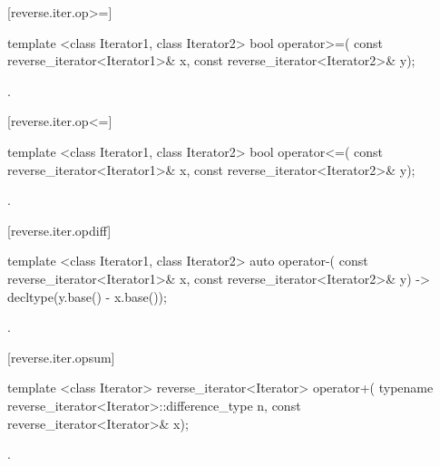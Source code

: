 [reverse.iter.op>=]{}

%
\begin{itemdecl}
template <class Iterator1, class Iterator2>
  bool operator>=(
    const reverse_iterator<Iterator1>& x,
    const reverse_iterator<Iterator2>& y);
\end{itemdecl}

\begin{itemdescr}
\pnum
\returns
{}.
\end{itemdescr}

[reverse.iter.op<=]{}

%
\begin{itemdecl}
template <class Iterator1, class Iterator2>
  bool operator<=(
    const reverse_iterator<Iterator1>& x,
    const reverse_iterator<Iterator2>& y);
\end{itemdecl}

\begin{itemdescr}
\pnum
\returns
{}.
\end{itemdescr}

[reverse.iter.opdiff]{}

%
\begin{itemdecl}
template <class Iterator1, class Iterator2>
    auto operator-(
    const reverse_iterator<Iterator1>& x,
    const reverse_iterator<Iterator2>& y) -> decltype(y.base() - x.base());
\end{itemdecl}

\begin{itemdescr}
\pnum
\returns
{}.
\end{itemdescr}

[reverse.iter.opsum]{}

%
\begin{itemdecl}
template <class Iterator>
  reverse_iterator<Iterator> operator+(
    typename reverse_iterator<Iterator>::difference_type n,
    const reverse_iterator<Iterator>& x);
\end{itemdecl}

\begin{itemdescr}
\pnum
\returns
{}.
\end{itemdescr}

